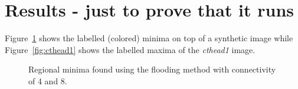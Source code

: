 \documentclass{InsightArticle}
\begin{document}
\section{Results - just to prove that it runs}
Figure~\ref{fig:artificial} shows the labelled (colored) minima on top of
a synthetic image while Figure~\ref{fig:cthead1} shows the labelled
maxima of the {\em cthead1} image.
\begin{figure}[htbp]
\begin{center}
\caption{Regional minima found using the flooding method with connectivity of 4 and 8.\label{fig:artificial}}
\end{center}
\end{figure}
\end{document}
